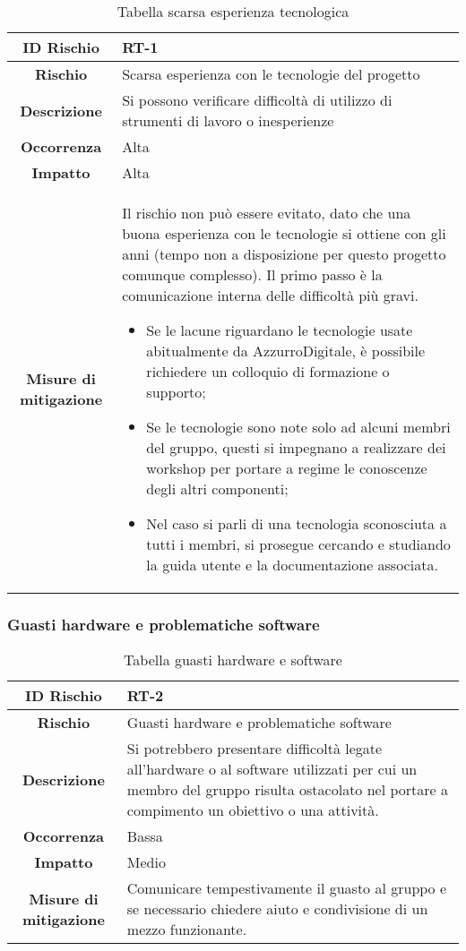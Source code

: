 \documentclass[10pt, a4paper]{article}
\begin{document}
{{{{\renewcommand{\arraystretch}{1.5}
\begin{table}[H]
\begin{tabularx}{\textwidth}{c|X}
\textbf{ID Rischio} & RT-1 \\
\hline
\textbf{Rischio} & Scarsa esperienza con le tecnologie del progetto \\
\hline
\textbf{Descrizione} & Si possono verificare difficoltà di utilizzo di strumenti di lavoro o inesperienze\\
\hline
\textbf{Occorrenza} & Alta\\
\hline
\textbf{Impatto} & Alta\\
\hline
\textbf{Misure di mitigazione} & Il rischio non può essere evitato, dato che una buona esperienza con le tecnologie si ottiene con gli anni (tempo non a disposizione per questo progetto comunque complesso). Il primo passo è la comunicazione interna delle difficoltà più gravi.
\begin{itemize}
    \item Se le lacune riguardano le tecnologie usate abitualmente da AzzurroDigitale, è possibile richiedere un colloquio di formazione o supporto;
    \item Se le tecnologie sono note solo ad alcuni membri del gruppo, questi si impegnano a realizzare dei workshop per portare a regime le conoscenze degli altri componenti;
    \item Nel caso si parli di una tecnologia sconosciuta a tutti i membri, si prosegue cercando e studiando la guida utente e la documentazione associata.
\end{itemize}
\end{tabularx}
\caption{Tabella scarsa esperienza tecnologica}
\end{table}


\subsubsection{Guasti hardware e problematiche software}

{\renewcommand{\arraystretch}{1.5}
\begin{table}[H]
\begin{tabularx}{\textwidth}{c|X}
\textbf{ID Rischio} & RT-2 \\
\hline
\textbf{Rischio} & Guasti hardware e problematiche software \\
\hline
\textbf{Descrizione} & Si potrebbero presentare difficoltà legate all’hardware o al software utilizzati per cui un membro del gruppo risulta ostacolato nel portare a compimento un obiettivo o una attività. \\
\hline
\textbf{Occorrenza} & Bassa \\
\hline
\textbf{Impatto} & Medio\\
\hline
\textbf{Misure di mitigazione} & Comunicare tempestivamente il guasto al gruppo e se necessario chiedere aiuto e condivisione di un mezzo funzionante.\\
\end{tabularx}
\caption{Tabella guasti hardware e software}
\end{table}


}}}}}
\end{document}
